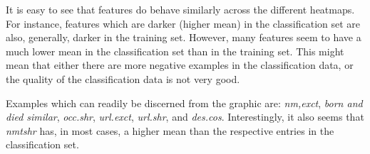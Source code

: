 \documentclass[epsfig,a4paper,11pt,titlepage,twoside,openany]{book}
\begin{document}
It is easy to see that features do behave similarly across the different heatmaps. For instance, features which are darker (higher mean) in the classification set are also, generally, darker in the training set. However, many features seem to have a much lower mean in the classification set than in the training set. This might mean that either there are more negative examples in the classification data, or the quality of the classification data is not very good.

Examples which can readily be discerned from the graphic are: \textit{nm,exct}, \textit{born and died similar}, \textit{occ.shr}, \textit{url.exct}, \textit{url.shr}, and \textit{des.cos}. Interestingly, it also seems that \textit{nmtshr} has, in most cases, a higher mean than the respective entries in the classification set.
\end{document}
